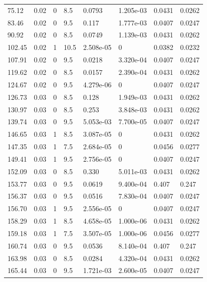 \documentclass[preview]{standalone}
\begin{document}
{{\begin{tabular}{L{1.2cm}C{1.2cm} C{0.3cm}C{0.5cm} C{1.4cm}C{1.4cm} C{1.4cm}C{1.4cm}}
  75.12  &  0.02  & 0     & 8.5 &  0.0793  & 1.205e-03  & 0.0431 &  0.0262   \\ 
  83.46  &  0.02  & 0     & 9.5 &  0.117  & 1.777e-03  & 0.0407 &  0.0247   \\ 
  90.92  &  0.02  & 0     & 8.5 &  0.0749  & 1.139e-03  & 0.0431 &  0.0262   \\ 
  102.45  &  0.02  & 1     & 10.5 &  2.508e-05  & 0  & 0.0382 &  0.0232   \\ 
  107.91  &  0.02  & 0     & 9.5 &  0.0218  & 3.320e-04  & 0.0407 &  0.0247   \\ 
  119.62  &  0.02  & 0     & 8.5 &  0.0157  & 2.390e-04  & 0.0431 &  0.0262   \\ 
  124.67  &  0.02  & 0     & 9.5 &  4.279e-06  & 0  & 0.0407 &  0.0247   \\ 
  126.73  &  0.03  & 0     & 8.5 &  0.128  & 1.949e-03  & 0.0431 &  0.0262   \\ 
  130.97  &  0.03  & 0     & 8.5 &  0.253  & 3.848e-03  & 0.0431 &  0.0262   \\ 
  139.74  &  0.03  & 0     & 9.5 &  5.053e-03  & 7.700e-05  & 0.0407 &  0.0247   \\ 
  146.65  &  0.03  & 1     & 8.5 &  3.087e-05  & 0  & 0.0431 &  0.0262   \\ 
  147.35  &  0.03  & 1     & 7.5 &  2.684e-05  & 0  & 0.0456 &  0.0277   \\ 
  149.41  &  0.03  & 1     & 9.5 &  2.756e-05  & 0  & 0.0407 &  0.0247   \\ 
  152.09  &  0.03  & 0     & 8.5 &  0.330  & 5.011e-03  & 0.0431 &  0.0262   \\ 
  153.77  &  0.03  & 0     & 9.5 &  0.0619  & 9.400e-04  & 0.407 &  0.247   \\ 
  156.37  &  0.03  & 0     & 9.5 &  0.0516  & 7.830e-04  & 0.0407 &  0.0247   \\ 
  156.70  &  0.03  & 1     & 9.5 &  2.556e-05  & 0  & 0.0407 &  0.0247   \\ 
  158.29  &  0.03  & 1     & 8.5 &  4.658e-05  & 1.000e-06  & 0.0431 &  0.0262   \\ 
  159.18  &  0.03  & 1     & 7.5 &  3.507e-05  & 1.000e-06  & 0.0456 &  0.0277   \\ 
  160.74  &  0.03  & 0     & 9.5 &  0.0536  & 8.140e-04  & 0.407 &  0.247   \\ 
  163.98  &  0.03  & 0     & 8.5 &  0.0284  & 4.320e-04  & 0.0431 &  0.0262   \\ 
  165.44  &  0.03  & 0     & 9.5 &  1.721e-03  & 2.600e-05  & 0.0407 &  0.0247   \\ 

\end{tabular}}}
\end{document}
